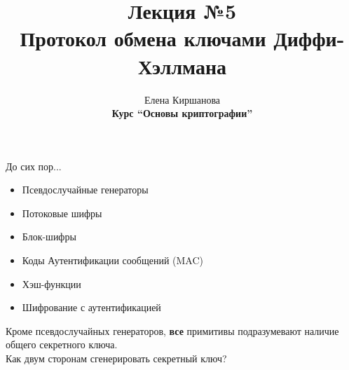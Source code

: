 \documentclass[usenames,dvipsnames,8pt,aspectratio=169]{beamer}
\title{Лекция №5 \\[10pt]

Протокол обмена ключами Диффи-Хэллмана
}
\date{ Елена Киршанова \\  \textbf{Курс ``Основы криптографии''} \\  }
\begin{document}
	
\begin{frame}
	\titlepage
\end{frame}

\begin{frame}{До сих пор...}
	\Large 
	\begin{itemize}
		\item  {\color{Orange}Псевдослучайные генераторы} 
		\item {\color{Orange} Потоковые шифры} 
		\item {\color{Orange} Блок-шифры } 
		\item {\color{Orange} Коды Аутентификации сообщений (MAC)}
		\item {\color{Orange} Хэш-функции}  
		\item {\color{Orange} Шифрование с аутентификацией }  
	\end{itemize}

\vspace{10pt}
\centering
 
Кроме псевдослучайных генераторов, \textbf{все} примитивы подразумевают наличие {\color{Orange} общего секретного  ключа.}\\[10pt]
Как двум сторонам сгенерировать секретный ключ? \\[10pt]



\end{frame}
\end{document}
